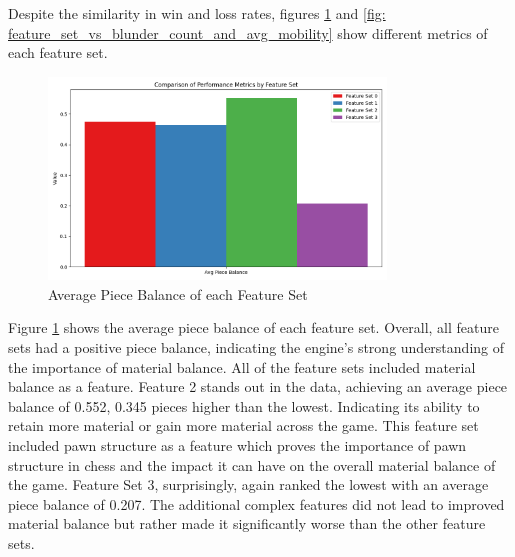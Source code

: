 Despite the similarity in win and loss rates, figures \ref{fig: feature_set_vs_piece_balance} and \ref{fig: feature_set_vs_blunder_count_and_avg_mobility} show different metrics of each feature set.







\begin{figure}[H]
    \centering
    \includegraphics[width=0.8\textwidth]{images/plots/featureSet/Feature_set_vs_piece_balance.png}
    \caption{Average Piece Balance of each Feature Set}
    \label{fig: feature_set_vs_piece_balance}
\end{figure}


Figure \ref{fig: feature_set_vs_piece_balance} shows the average piece balance of each feature set. Overall, all feature sets had a positive piece balance, indicating the engine's strong understanding of the importance of material balance. All of the feature sets included material balance as a feature. Feature 2 stands out in the data, achieving an average piece balance of 0.552, 0.345 pieces higher than the lowest. Indicating its ability to retain more material or gain more material across the game. This feature set included pawn structure as a feature which proves the importance of pawn structure in chess and the impact it can have on the overall material balance of the game. Feature Set 3, surprisingly, again ranked the lowest with an average piece balance of 0.207. The additional complex features did not lead to improved material balance but rather made it significantly worse than the other feature sets. 


